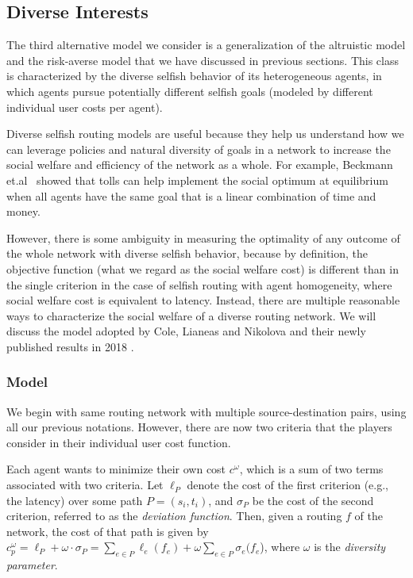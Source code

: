 \subsection{Diverse Interests}\label{sec:diversity}

The third alternative model we consider is a generalization of the altruistic model and the risk-averse model that we have discussed in previous sections. This class is characterized by the diverse selfish behavior of its heterogeneous agents, in which agents pursue potentially different selfish goals (modeled by different individual user costs per agent).%

Diverse selfish routing models are useful because they help us understand how we can leverage policies and natural diversity of goals in a network to increase the social welfare and efficiency of the network as a whole. For example, Beckmann et.al~\cite{beckmann1956studies} showed that tolls can help implement the social optimum at equilibrium when all agents have the same goal that is a linear combination of time and money.

However, there is some ambiguity in measuring the optimality of any outcome of the whole network with diverse selfish behavior, because by definition, the objective function (what we regard as the social welfare cost) is different than in the single criterion in the case of selfish routing with agent homogeneity, where social welfare cost is equivalent to latency. Instead, there are multiple reasonable ways to characterize the social welfare of a diverse routing network. We will discuss the model adopted by Cole, Lianeas and Nikolova and their newly published results in 2018 \cite{ijcai2018-24}.

\subsubsection{Model}

We begin with same routing network with multiple source-destination pairs, using all our previous notations. However, there are now two criteria that the players consider in their individual user cost function.

Each agent wants to minimize their own cost $c^\omega$, which is a sum of two terms associated with two criteria. Let $\ell_P$ denote the cost of the first criterion (e.g., the latency) over some path $P=(s_i, t_i)$, and $\sigma_P$ be the cost of the second criterion, referred to as the {\it deviation function}. Then, given a routing $f$ of the network, the cost of that path is given by $c^\omega_p = \ell_P+\omega\cdot \sigma_P=\sum_{e\in P} \ell_e(f_e)+ \omega\sum_{e\in P}\sigma_e(f_e$), where $\omega$ is the {\it diversity parameter}.


